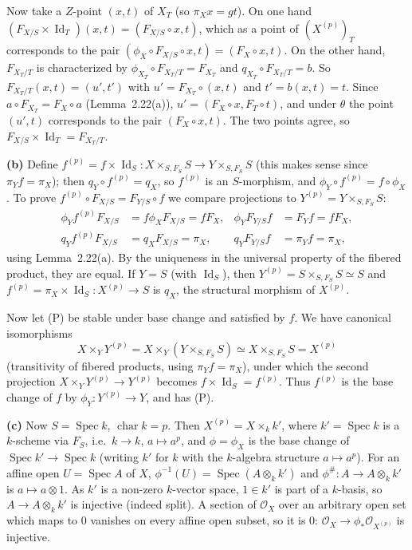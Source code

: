 \documentclass[11pt]{article}
\begin{document}
Now take a $Z$-point $(x,t)$ of $X_T$ (so $\pi_Xx=gt$). On one hand $(F_{X/S}\times\operatorname{Id}_T)(x,t)=(F_{X/S}\circ x,t)$, which as a point of $(X^{(p)})_T$ corresponds to the pair $(\phi_X\circ F_{X/S}\circ x,t)=(F_X\circ x,t)$. On the other hand, $F_{X_T/T}$ is characterized by $\phi_{X_T}\circ F_{X_T/T}=F_{X_T}$ and $q_{X_T}\circ F_{X_T/T}=b$. So $F_{X_T/T}(x,t)=(u',t')$ with $u'=F_{X_T}\circ(x,t)$ and $t'=b(x,t)=t$. Since $a\circ F_{X_T}=F_X\circ a$ (Lemma~2.22(a)), $u'=(F_X\circ x,F_T\circ t)$, and under $\theta$ the point $(u',t)$ corresponds to the pair $(F_X\circ x,t)$. The two points agree, so $F_{X/S}\times\operatorname{Id}_T=F_{X_T/T}$.

\textbf{(b)} Define $f^{(p)}=f\times\operatorname{Id}_S:X\times_{S,F_S}S\to Y\times_{S,F_S}S$ (this makes sense since $\pi_Yf=\pi_X$); then $q_Y\circ f^{(p)}=q_X$, so $f^{(p)}$ is an $S$-morphism, and $\phi_Y\circ f^{(p)}=f\circ\phi_X$. To prove $f^{(p)}\circ F_{X/S}=F_{Y/S}\circ f$ we compare projections to $Y^{(p)}=Y\times_{S,F_S}S$:
\begin{align*}
\phi_Yf^{(p)}F_{X/S}&=f\phi_XF_{X/S}=fF_X,& \phi_YF_{Y/S}f&=F_Yf=fF_X,\\
q_Yf^{(p)}F_{X/S}&=q_XF_{X/S}=\pi_X,& q_YF_{Y/S}f&=\pi_Yf=\pi_X,
\end{align*}
using Lemma~2.22(a). By the uniqueness in the universal property of the fibered product, they are equal. If $Y=S$ (with $\operatorname{Id}_S$), then $Y^{(p)}=S\times_{S,F_S}S\simeq S$ and $f^{(p)}=\pi_X\times\operatorname{Id}_S:X^{(p)}\to S$ is $q_X$, the structural morphism of $X^{(p)}$.

Now let (P) be stable under base change and satisfied by $f$. We have canonical isomorphisms
\[ X\times_YY^{(p)}=X\times_Y(Y\times_{S,F_S}S)\simeq X\times_{S,F_S}S=X^{(p)} \]
(transitivity of fibered products, using $\pi_Yf=\pi_X$), under which the second projection $X\times_YY^{(p)}\to Y^{(p)}$ becomes $f\times\operatorname{Id}_S=f^{(p)}$. Thus $f^{(p)}$ is the base change of $f$ by $\phi_Y:Y^{(p)}\to Y$, and has (P).

\textbf{(c)} Now $S=\operatorname{Spec}k$, $\operatorname{char}k=p$. Then $X^{(p)}=X\times_kk'$, where $k'=\operatorname{Spec}k$ is a $k$-scheme via $F_S$, i.e.\ $k\to k$, $a\mapsto a^p$, and $\phi=\phi_X$ is the base change of $\operatorname{Spec}k'\to\operatorname{Spec}k$ (writing $k'$ for $k$ with the $k$-algebra structure $a\mapsto a^p$). For an affine open $U=\operatorname{Spec}A$ of $X$, $\phi^{-1}(U)=\operatorname{Spec}(A\otimes_kk')$ and $\phi^\#:A\to A\otimes_kk'$ is $a\mapsto a\otimes1$. As $k'$ is a non-zero $k$-vector space, $1\in k'$ is part of a $k$-basis, so $A\to A\otimes_kk'$ is injective (indeed split). A section of $\mathcal O_X$ over an arbitrary open set which maps to $0$ vanishes on every affine open subset, so it is $0$: $\mathcal O_X\to\phi_*\mathcal O_{X^{(p)}}$ is injective.
\end{document}
